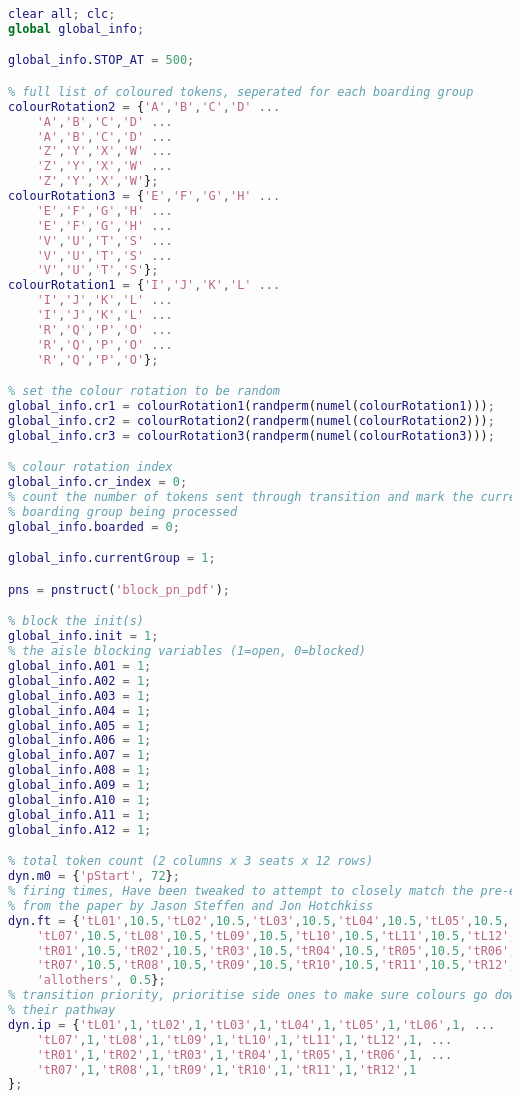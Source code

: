 \begin{lstlisting}[language=MATLAB, caption=block.m]
clear all; clc;
global global_info;

global_info.STOP_AT = 500;

% full list of coloured tokens, seperated for each boarding group
colourRotation2 = {'A','B','C','D' ...
    'A','B','C','D' ...
    'A','B','C','D' ...
    'Z','Y','X','W' ...
    'Z','Y','X','W' ...
    'Z','Y','X','W'};
colourRotation3 = {'E','F','G','H' ...
    'E','F','G','H' ...
    'E','F','G','H' ...
    'V','U','T','S' ... 
    'V','U','T','S' ...
    'V','U','T','S'};
colourRotation1 = {'I','J','K','L' ...
    'I','J','K','L' ...
    'I','J','K','L' ...
    'R','Q','P','O' ...
    'R','Q','P','O' ...
    'R','Q','P','O'};

% set the colour rotation to be random
global_info.cr1 = colourRotation1(randperm(numel(colourRotation1)));
global_info.cr2 = colourRotation2(randperm(numel(colourRotation2)));
global_info.cr3 = colourRotation3(randperm(numel(colourRotation3)));

% colour rotation index
global_info.cr_index = 0;
% count the number of tokens sent through transition and mark the current
% boarding group being processed
global_info.boarded = 0;

global_info.currentGroup = 1;

pns = pnstruct('block_pn_pdf');

% block the init(s)
global_info.init = 1;
% the aisle blocking variables (1=open, 0=blocked)
global_info.A01 = 1;
global_info.A02 = 1;
global_info.A03 = 1;
global_info.A04 = 1;
global_info.A05 = 1;
global_info.A06 = 1;
global_info.A07 = 1;
global_info.A08 = 1;
global_info.A09 = 1;
global_info.A10 = 1;
global_info.A11 = 1;
global_info.A12 = 1;

% total token count (2 columns x 3 seats x 12 rows)
dyn.m0 = {'pStart', 72};
% firing times, Have been tweaked to attempt to closely match the pre-existing results
% from the paper by Jason Steffen and Jon Hotchkiss
dyn.ft = {'tL01',10.5,'tL02',10.5,'tL03',10.5,'tL04',10.5,'tL05',10.5,'tL06',10.5, ...
    'tL07',10.5,'tL08',10.5,'tL09',10.5,'tL10',10.5,'tL11',10.5,'tL12',10.5, ...
    'tR01',10.5,'tR02',10.5,'tR03',10.5,'tR04',10.5,'tR05',10.5,'tR06',10.5, ...
    'tR07',10.5,'tR08',10.5,'tR09',10.5,'tR10',10.5,'tR11',10.5,'tR12',10.5, ...
    'allothers', 0.5};
% transition priority, prioritise side ones to make sure colours go down
% their pathway
dyn.ip = {'tL01',1,'tL02',1,'tL03',1,'tL04',1,'tL05',1,'tL06',1, ...
    'tL07',1,'tL08',1,'tL09',1,'tL10',1,'tL11',1,'tL12',1, ...
    'tR01',1,'tR02',1,'tR03',1,'tR04',1,'tR05',1,'tR06',1, ...
    'tR07',1,'tR08',1,'tR09',1,'tR10',1,'tR11',1,'tR12',1
};


\end{lstlisting}
